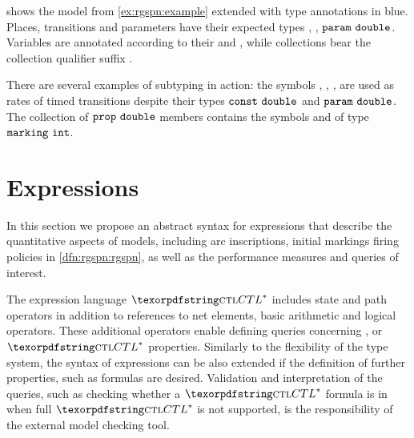 \begin{runningExample}
   shows the model from \vref{ex:rgspn:example} extended with type annotations in blue. Places, transitions and parameters have their expected types , , \(\texttt{\upshape param}\ \texttt{\upshape double}\). Variables are annotated according to their  and , while collections bear the collection qualifier suffix \lit{[]}.

  There are several examples of subtyping in action: the symbols , , ,  are used as rates of timed transitions despite their types \(\texttt{\upshape const}\ \texttt{\upshape double}\) and \(\texttt{\upshape param}\ \texttt{\upshape double}\). The collection  of \(\texttt{\upshape prop}\ \texttt{\upshape double}\) members contains the symbols  and  of type \(\texttt{\upshape marking}\ \texttt{\upshape int}\).
\end{runningExample}

\section{Expressions}
\label{sec:rgspn:expression}

In this section we propose an abstract syntax for expressions that describe the quantitative aspects of  models, including arc inscriptions, initial markings firing policies in \vref{dfn:rgspn:rgspn}, as well as the performance measures and queries of interest.

The expression language \(\textabbr{CTL}^*\) includes state and path operators in addition to references to net elements, basic arithmetic and logical operators. These additional operators enable defining queries concerning ,  or \(\textabbr{CTL}^*\) properties. Similarly to the flexibility of the type system, the syntax of expressions can be also extended if the definition of further properties, such as  formulas are desired. Validation and interpretation of the queries, such as checking whether a \(\textabbr{CTL}^*\) formula is in  when full \(\textabbr{CTL}^*\) is not supported, is the responsibility of the external model checking tool.

